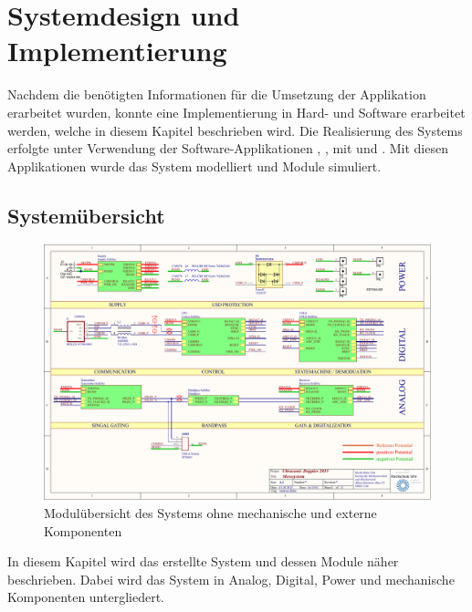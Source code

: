 \chapter{Systemdesign und Implementierung}
Nachdem die benötigten Informationen für die Umsetzung der Applikation erarbeitet wurden, konnte eine Implementierung in Hard- und Software erarbeitet werden, welche in diesem Kapitel beschrieben wird. Die Realisierung des Systems erfolgte unter Verwendung der Software-Applikationen , ,  mit  und . Mit diesen Applikationen wurde das System modelliert und Module simuliert.
\section{Systemübersicht}
\begin{figure}[!h]
	\centering
   	\includegraphics[page=1,width=1.0\textwidth, trim= 5mm 5mm 5mm 5mm, clip=true]{images/pcb/new.PDF}%
    \caption{Modulübersicht des Systems ohne mechanische und externe Komponenten}
    \label{fig:system}
\end{figure}
In diesem Kapitel wird das erstellte System und dessen Module näher beschrieben. Dabei wird das System in Analog, Digital, Power und mechanische Komponenten untergliedert.
